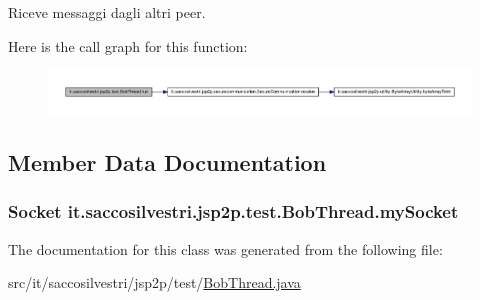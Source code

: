 \-Riceve messaggi dagli altri peer. 



\-Here is the call graph for this function\-:
\nopagebreak
\begin{figure}[H]
\begin{center}
\leavevmode
\includegraphics[width=350pt]{classit_1_1saccosilvestri_1_1jsp2p_1_1test_1_1_bob_thread_ae9866d921fa3d15081060df6c9e873e9_cgraph}
\end{center}
\end{figure}




\subsection{\-Member \-Data \-Documentation}
\hypertarget{classit_1_1saccosilvestri_1_1jsp2p_1_1test_1_1_bob_thread_ad788d045c926c3c835dbadc54e3d0c12}{
\subsubsection[{my\-Socket}]{\setlength{\rightskip}{0pt plus 5cm}\-Socket {\bf it.\-saccosilvestri.\-jsp2p.\-test.\-Bob\-Thread.\-my\-Socket}}}
\label{classit_1_1saccosilvestri_1_1jsp2p_1_1test_1_1_bob_thread_ad788d045c926c3c835dbadc54e3d0c12}


\-The documentation for this class was generated from the following file\-:\begin{DoxyCompactItemize}
\item 
src/it/saccosilvestri/jsp2p/test/\hyperlink{_bob_thread_8java}{\-Bob\-Thread.\-java}\end{DoxyCompactItemize}
